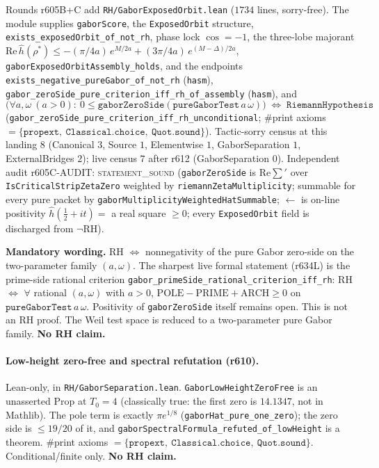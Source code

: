 \documentclass[11pt]{article}
\theoremstyle{definition}
\theoremstyle{remark}
\begin{document}
Rounds r605B+C add \texttt{RH/GaborExposedOrbit.lean} ($1734$ lines,
sorry-free).  The module supplies \texttt{gaborScore}, the
\texttt{ExposedOrbit} structure, \texttt{exists\_exposedOrbit\_of\_not\_rh},
phase lock $\cos=-1$, the three-lobe majorant
$\mathrm{Re}\,\hat h(\rho^*)\le -(\pi/4a)\,e^{M/2a}+(3\pi/4a)\,e^{(M-\Delta)/2a}$,
\texttt{gaborExposedOrbitAssembly\_holds}, and the endpoints
\texttt{exists\_negative\_pureGabor\_of\_not\_rh} (\texttt{hasm}),
\texttt{gabor\_zeroSide\_pure\_criterion\_iff\_rh\_of\_assembly}
(\texttt{hasm}), and
\[
\bigl(\forall a,\omega\ (a>0):\ 
0\le\texttt{gaborZeroSide}(\texttt{pureGaborTest}\,a\,\omega)\bigr)
\;\Longleftrightarrow\;
\texttt{RiemannHypothesis}
\]
(\texttt{gabor\_zeroSide\_pure\_criterion\_iff\_rh\_unconditional};
$\#$print axioms $=\{\texttt{propext},\ \texttt{Classical.choice},\ \texttt{Quot.sound}\}$).
Tactic-sorry census at this landing $8$ (Canonical $3$, Source $1$,
Elementwise $1$, GaborSeparation $1$, ExternalBridges $2$);
live census $7$ after r612 (GaborSeparation $0$).
Independent audit r605C-AUDIT: \textsc{statement\_sound}
(\texttt{gaborZeroSide} is $\mathrm{Re}\sum'$ over
\texttt{IsCriticalStripZetaZero} weighted by
\texttt{riemannZetaMultiplicity}; summable for every pure packet by
\texttt{gaborMultiplicityWeightedHatSummable}; $\leftarrow$ is on-line
positivity $\hat h(\tfrac12+it)=$ a real square $\ge 0$; every
\texttt{ExposedOrbit} field is discharged from $\neg$RH).

\textbf{Mandatory wording.}
RH $\Longleftrightarrow$ nonnegativity of the pure Gabor zero-side on
the two-parameter family $(a,\omega)$.  The sharpest live formal
statement (r634L) is the prime-side rational criterion
\texttt{gabor\_primeSide\_rational\_criterion\_iff\_rh}:
RH $\Longleftrightarrow$ $\forall$ rational $(a,\omega)$ with $a>0$,
$\mathrm{POLE}-\mathrm{PRIME}+\mathrm{ARCH}\ge 0$ on
$\texttt{pureGaborTest}\,a\,\omega$.
Positivity of \texttt{gaborZeroSide} itself remains open.
This is not an RH proof.  The Weil test space is reduced to a
two-parameter pure Gabor family.
\textbf{No RH claim.}

\paragraph{Low-height zero-free and spectral refutation (r610).}
Lean-only, in \texttt{RH/GaborSeparation.lean}.
\texttt{GaborLowHeightZeroFree} is an unasserted Prop at $T_0=4$
(classically true: the first zero is $14.1347$, not in Mathlib).
The pole term is exactly $\pi e^{1/8}$
(\texttt{gaborHat\_pure\_one\_zero}); the zero side is $\le 19/20$ of
it, and \texttt{gaborSpectralFormula\_refuted\_of\_lowHeight} is a
theorem.  $\#$print axioms
$=\{\texttt{propext},\ \texttt{Classical.choice},\ \texttt{Quot.sound}\}$.
Conditional/finite only.  \textbf{No RH claim.}
\end{document}
